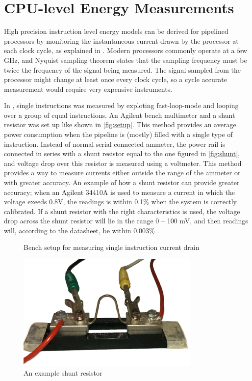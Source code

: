 \section{CPU-level Energy Measurements}
\label{sec:energymeasure}

High precision instruction level energy models can be derived for pipelined
processors by monitoring the instantaneous current drawn by the processor at
each clock cycle, as explained in \cite{nikolaidis2005instruction}. Modern
processors commonly operate at a few GHz, and Nyquist sampling theorem
\cite{nyquist1928certain} states that the sampling frequency must be twice the
frequency of the signal being measured. The signal sampled from the processor
might change at least once every clock cycle, so a cycle accurate measurement
would require very expensive instruments.

In \cite{rundehvatum2013exploring}, single instructions was measured by
exploting fast-loop-mode and looping over a group of equal instructions. An
Agilent bench multimeter and a shunt resistor was set up like shown in
\autoref{fig:setup}. This method provides an average power consumption when the
pipeline is (mostly) filled with a single type of instruction. Instead of normal
serial connected ammeter, the power rail is connected in series with a shunt
resistor equal to the one figured in \autoref{fig:shunt}, and voltage drop over
this resistor is measured using a voltmeter. This method provides a way to
measure currents either outside the range of the ammeter or with greater
accuracy. An example of how a shunt resistor can provide greater accuracy; when
an Agilent 34410A is used to measure a current in which the voltage exeeds 0.8V,
the readings is within 0.1\% when the system is correctly calibrated. If a shunt
resistor with the right characteristics is used, the voltage drop across the
shunt resistor will lie in the range 0 -- 100 mV, and then readings will,
according to the datasheet, be within 0.003\% \cite{agilent34410a}.

\begin{figure}
    \centering
    
    \caption{Bench setup for measuring single instruction current drain}
    \label{fig:setup}
\end{figure}

\begin{figure}
    \centering
    \includegraphics[width=0.8\textwidth]{figs/shunt.jpg}
    \caption{An example shunt resistor}
    \label{fig:shunt}
\end{figure}



